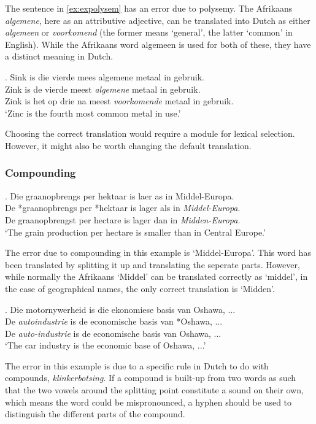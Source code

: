 \documentclass[11pt]{article}
\begin{document}
The sentence in \ref{ex:expolysem} has an error due to polysemy. The Afrikaans {\em algemene}, here as
an attributive adjective, can be translated into Dutch as either {\em algemeen} or {\em voorkomend} 
(the former means `general', the latter `common' in English). While the Afrikaans word algemeen is used
for both of these, they have a distinct meaning in Dutch.

\ex. \label{ex:expolysem} 
    Sink is die vierde mees algemene metaal in gebruik. \\
    Zink is de vierde meest {\em algemene} metaal in gebruik. \\
    Zink is het op drie na meest {\em voorkomende} metaal in gebruik. \\
    `Zinc is the fourth most common metal in use.' 

Choosing the correct translation would require a module for lexical selection. However, it might also
be worth changing the default translation.

\subsubsection{Compounding}

\ex. \label{ex:excompsplit} 
    Die graanopbrengs per hektaar is laer as in Middel-Europa. \\
    De *graanopbrengs per *hektaar is lager als in {\em Middel-Europa}. \\
    De graanopbrengst per hectare is lager dan in {\em Midden-Europa}. \\
   `The grain production per hectare is smaller than in Central Europe.'

The error due to compounding in this example is `Middel-Europa'. This word has been translated by 
splitting it up and translating the seperate parts.
However, while normally the Afrikaans `Middel' can be translated correctly as `middel', in the 
case of geographical names, the only correct translation is `Midden'.

\ex. \label{ex:excomphyphen} 
    Die motornywerheid is die ekonomiese basis van Oshawa, ...  \\
    De {\em autoindustrie} is de economische basis van *Oshawa, ... \\
    De {\em auto-industrie} is de economische basis van Oshawa, ... \\
   `The car industry is the economic base of Oshawa, ...'

The error in this example is due to a specific rule in Dutch to do with 
compounds, \emph{klinkerbotsing}. If a compound is built-up from two words as such 
that the two vowels around the splitting point constitute a sound on their own, 
which means the word could be mispronounced, a hyphen should be used to distinguish 
the different parts of the compound. 
\end{document}
